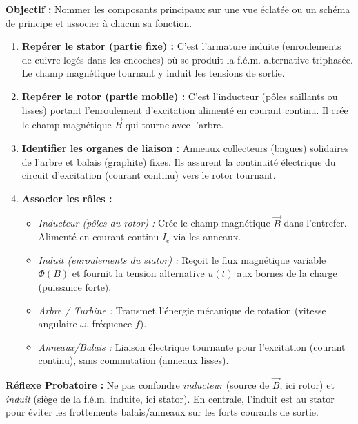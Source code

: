 \documentclass[11pt]{article}
\begin{document}
\begin{methode}
    \textbf{Objectif :} Nommer les composants principaux sur une vue éclatée ou un schéma de principe et associer à chacun sa fonction.
    \begin{enumerate}
        \item \textbf{Repérer le stator (partie fixe) :} C'est l'armature induite (enroulements de cuivre logés dans les encoches) où se produit la f.é.m. alternative triphasée. Le champ magnétique tournant y induit les tensions de sortie.
        \item \textbf{Repérer le rotor (partie mobile) :} C'est l'inducteur (pôles saillants ou lisses) portant l'enroulement d'excitation alimenté en courant continu. Il crée le champ magnétique $\vec{B}$ qui tourne avec l'arbre.
        \item \textbf{Identifier les organes de liaison :} Anneaux collecteurs (bagues) solidaires de l'arbre et balais (graphite) fixes. Ils assurent la continuité électrique du circuit d'excitation (courant continu) vers le rotor tournant.
        \item \textbf{Associer les rôles :}
        \begin{itemize}
            \item \emph{Inducteur (pôles du rotor) :} Crée le champ magnétique $\vec{B}$ dans l'entrefer. Alimenté en courant continu $I_e$ via les anneaux.
            \item \emph{Induit (enroulements du stator) :} Reçoit le flux magnétique variable $\Phi(B)$ et fournit la tension alternative $u(t)$ aux bornes de la charge (puissance forte).
            \item \emph{Arbre / Turbine :} Transmet l'énergie mécanique de rotation (vitesse angulaire $\omega$, fréquence $f$).
            \item \emph{Anneaux/Balais :} Liaison électrique tournante pour l'excitation (courant continu), sans commutation (anneaux lisses).
        \end{itemize}
    \end{enumerate}
    \textbf{Réflexe Probatoire :} Ne pas confondre \emph{inducteur} (source de $\vec{B}$, ici rotor) et \emph{induit} (siège de la f.é.m. induite, ici stator). En centrale, l'induit est au stator pour éviter les frottements balais/anneaux sur les forts courants de sortie.
\end{methode}
\end{document}
